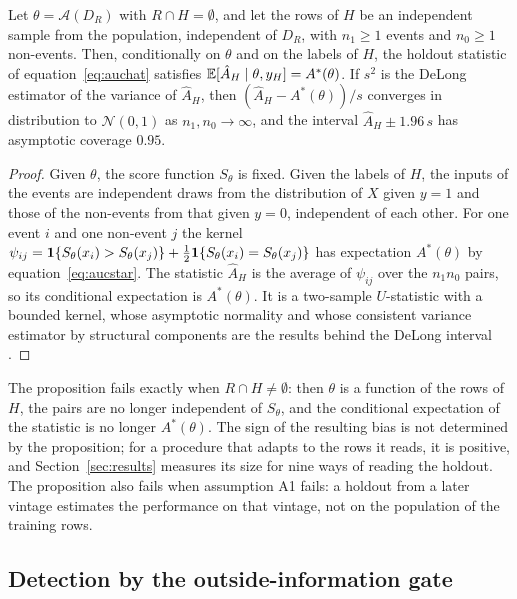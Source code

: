 \begin{proposition}[Unbiasedness]
\label{prop:unbiased}
Let $\theta=\mathcal A(D_R)$ with $R\cap H=\emptyset$, and let the rows of $H$ be an independent sample from the population, independent of $D_R$, with $n_1\ge1$ events and $n_0\ge1$ non-events. Then, conditionally on $\theta$ and on the labels of $H$, the holdout statistic of equation~\eqref{eq:auchat} satisfies $\mathbb{E}[\hat A_H\mid\theta,y_H]=A^{\ast}(\theta)$. If $s^2$ is the DeLong estimator of the variance of $\hat A_H$, then $(\hat A_H-A^{\ast}(\theta))/s$ converges in distribution to $\mathcal N(0,1)$ as $n_1,n_0\to\infty$, and the interval $\hat A_H\pm1.96\,s$ has asymptotic coverage $0.95$.
\end{proposition}
\begin{proof}
Given $\theta$, the score function $S_\theta$ is fixed. Given the labels of $H$, the inputs of the events are independent draws from the distribution of $X$ given $y=1$ and those of the non-events from that given $y=0$, independent of each other. For one event $i$ and one non-event $j$ the kernel $\psi_{ij}=\mathbf{1}\{S_\theta(x_i)>S_\theta(x_j)\}+\frac12\mathbf{1}\{S_\theta(x_i)=S_\theta(x_j)\}$ has expectation $A^{\ast}(\theta)$ by equation~\eqref{eq:aucstar}. The statistic $\hat A_H$ is the average of $\psi_{ij}$ over the $n_1n_0$ pairs, so its conditional expectation is $A^{\ast}(\theta)$. It is a two-sample $U$-statistic with a bounded kernel, whose asymptotic normality and whose consistent variance estimator by structural components are the results behind the DeLong interval \citep{delong1988,hanley1982}.
\end{proof}
The proposition fails exactly when $R\cap H\neq\emptyset$: then $\theta$ is a function of the rows of $H$, the pairs are no longer independent of $S_\theta$, and the conditional expectation of the statistic is no longer $A^{\ast}(\theta)$. The sign of the resulting bias is not determined by the proposition; for a procedure that adapts to the rows it reads, it is positive, and Section~\ref{sec:results} measures its size for nine ways of reading the holdout. The proposition also fails when assumption A1 fails: a holdout from a later vintage estimates the performance on that vintage, not on the population of the training rows.

\subsection{Detection by the outside-information gate}

